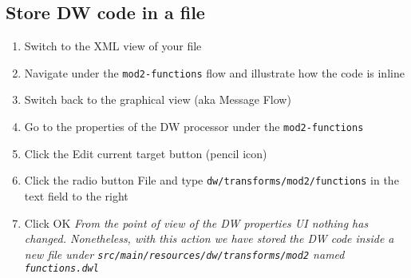 \subsection{Store DW code in a file}
\begin{enumerate}
\item Switch to the XML view of your file
\item Navigate under the \lstinline!mod2-functions! flow and illustrate how the code is inline
\item Switch back to the graphical view (aka Message Flow)
\item Go to the properties of the DW processor under the \lstinline!mod2-functions!
\item Click the Edit current target button (pencil icon)
\item Click the radio button File and type \lstinline!dw/transforms/mod2/functions! in the text field to the right
\item Click OK
  \emph {
    From the point of view of the DW properties UI nothing has changed.  Nonetheless, with this action we have stored the DW code inside a new file under \lstinline!src/main/resources/dw/transforms/mod2! named \lstinline!functions.dwl!
  }
\end{enumerate}


